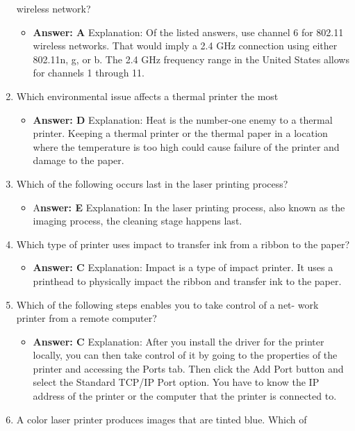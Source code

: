 \documentclass{article}
\begin{document}
\begin{enumerate}
wireless network?
    \begin{itemize}
        \item \textbf{Answer: A}
Explanation: Of the listed answers, use channel 6 for 802.11 wireless networks.
That would imply a 2.4 GHz connection using either 802.11n, g, or b. The 2.4 GHz
frequency range in the United States allows for channels 1 through 11.
    \end{itemize}
    \item Which environmental issue affects a thermal printer the most
    \begin{itemize}
        \item \textbf{Answer: D}
Explanation: Heat is the number-one enemy to a thermal printer. Keeping a thermal
printer or the thermal paper in a location where the temperature is too high could
cause failure of the printer and damage to the paper.
    \end{itemize}
    \item Which of the following occurs last in the laser printing process?
    \begin{itemize}
        \item A\textbf{nswer: E}
Explanation: In the laser printing process, also known as the imaging process, the
cleaning stage happens last.
    \end{itemize}
    \item Which type of printer uses impact to transfer ink from a ribbon to
the paper?
    \begin{itemize}
        \item \textbf{Answer: C}
Explanation: Impact is a type of impact printer. It uses a printhead to physically impact
the ribbon and transfer ink to the paper.
    \end{itemize}
    \item Which of the following steps enables you to take control of a net-
work printer from a remote computer?
    \begin{itemize}
        \item \textbf{Answer: C}
Explanation: After you install the driver for the printer locally, you can then take control
of it by going to the properties of the printer and accessing the Ports tab. Then click
the Add Port button and select the Standard TCP/IP Port option. You have to know the
IP address of the printer or the computer that the printer is connected to.
    \end{itemize}
    \item A color laser printer produces images that are tinted blue. Which of

\end{enumerate}
\end{document}
